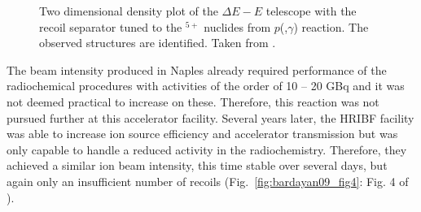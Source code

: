 \begin{figure}
\caption{Two dimensional density plot of the $\Delta{}E-E$ telescope with the recoil separator tuned to the $^{5+}$ nuclides from $p$(,$\gamma$) reaction. The observed structures are identiﬁed. Taken from \cite{gial00}.}
\label{fig:gialanella00_fig2}
\end{figure}%
The beam intensity produced in Naples already required performance of the radiochemical procedures with activities of the order of 10 -- 20 GBq and it was not deemed practical to increase on these. Therefore, this reaction was not pursued further at this accelerator facility. Several years later, the HRIBF facility was able to increase ion source efficiency and accelerator transmission but was only capable to handle a reduced activity in the radiochemistry. Therefore, they achieved a similar  ion beam intensity, this time stable over several days, but again only an insufficient number of recoils (Fig.\ \ref{fig:bardayan09_fig4}: Fig. 4 of \cite{bard09}).
